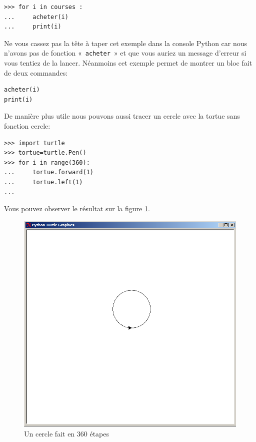 \begin{Verbatim}[frame=single,rulecolor=\color{gray}, label=ne pas saisir]
>>> for i in courses :
... 	acheter(i)
... 	print(i)
\end{Verbatim}

Ne vous cassez pas la tête à taper cet exemple dans la console Python car nous n'avons pas de fonction « \texttt{acheter} » et que vous auriez un message d'erreur si vous tentiez de la lancer. 
Néanmoins cet exemple permet de montrer un bloc fait de deux commandes:

\begin{Verbatim}[frame=single,rulecolor=\color{gray}, label=ne pas saisir]
acheter(i)
print(i)
\end{Verbatim}

De manière plus utile nous pouvons aussi tracer un cercle avec la tortue sans fonction cercle:

\begin{Verbatim}[frame=single,rulecolor=\color{green}, label=à taper avec attention]
>>> import turtle
>>> tortue=turtle.Pen()
>>> for i in range(360):
...     tortue.forward(1)
...     tortue.left(1)
...
\end{Verbatim}

Vous pouvez observer le résultat sur la figure \ref{fig:cercle}.
\begin{figure}[H]
\centering
\includegraphics[scale=0.4]{images/cercle.png}
\caption{Un cercle fait en 360 étapes}
\label{fig:cercle}
\end{figure}


